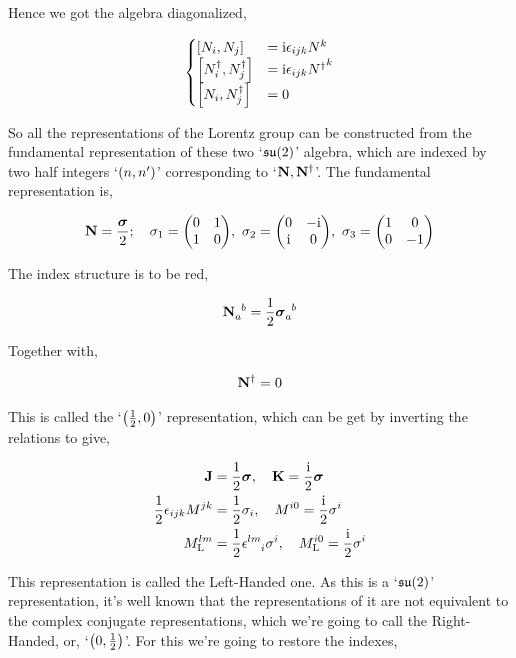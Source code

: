 Hence we got the algebra diagonalized,

\begin{align}
    \begin{cases}
        \comm{N_i}{N_j}&=\im\epsilon_{ijk}N^k\\
        \comm{N^\dagger_i}{N^\dagger_j}&=\im\epsilon_{ijk}{N^\dagger}^k\\
        \comm{N_i}{N^\dagger_j}&=0
    \end{cases}\nonumber
\end{align}

So all the representations of the Lorentz group can be constructed from the fundamental representation of these two `$\mathfrak{su}\qty(2)$' algebra, which are indexed by two half integers `$\qty(n,n')$' corresponding to `$\vb N, {\vb N}^\dagger$'. The fundamental representation is,

\begin{align}
    \vb N=\frac{\boldsymbol\sigma}{2};\ \ \ \sigma_1=\mqty(0&1\\1&0),\ \sigma_2=\mqty(0&-\im\\\im&0),\ \sigma_3=\mqty(1&0\\0&-1)\nonumber
\end{align}

The index structure is to be red,

\begin{align}
    \tensor{{\vb N}}{_a^b}=\frac12\tensor{{\boldsymbol\sigma}}{_a^b}\nonumber
\end{align}

Together with,

\begin{align}
    {\vb N}^\dagger=0\nonumber
\end{align}

This is called the `$\qty(\frac12,0)$' representation, which can be get by inverting the relations to give,

\begin{align}
    \vb J&=\frac12\boldsymbol\sigma,\ \ \ \vb K=\frac\im2\boldsymbol\sigma\nonumber\\
    \frac12\epsilon_{ijk}M^{jk}&=\frac12\sigma_i,\ \ \ M^{i0}=\frac\im2\sigma^i\nonumber\\
    M_{\textnormal L}^{lm}&=\frac12\tensor{\epsilon}{^l^m_i}\sigma^i,\ \ \ M_{\textnormal L}^{i0}=\frac\im2\sigma^i\nonumber
\end{align}

This representation is called the Left-Handed one. As this is a `$\mathfrak{su}\qty(2)$' representation, it's well known that the representations of it are not equivalent to the complex conjugate representations, which we're going to call the Right-Handed, or, `$\qty(0,\frac12)$'. For this we're going to restore the indexes,

